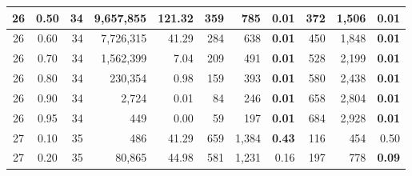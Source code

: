 \begin{table}[H]
\begin{tabular}{|c|c|r|r|r|r|r|r|r|r|r|}
        26                              & 0.50                              & 34                                     & 9,657,855                         & 121.32                            & 359           & 785              & \textbf{0.01} & 372           & 1,506            & \textbf{0.01} \\ \hline
        26                              & 0.60                              & 34                                     & 7,726,315                         & 41.29                             & 284           & 638              & \textbf{0.01} & 450           & 1,848            & \textbf{0.01} \\ \hline
        26                              & 0.70                              & 34                                     & 1,562,399                         & 7.04                              & 209           & 491              & \textbf{0.01} & 528           & 2,199            & \textbf{0.01} \\ \hline
        26                              & 0.80                              & 34                                     & 230,354                           & 0.98                              & 159           & 393              & \textbf{0.01} & 580           & 2,438            & \textbf{0.01} \\ \hline
        26                              & 0.90                              & 34                                     & 2,724                             & 0.01                              & 84            & 246              & \textbf{0.01} & 658           & 2,804            & \textbf{0.01} \\ \hline
        26                              & 0.95                              & 34                                     & 449                               & 0.00                              & 59            & 197              & \textbf{0.01} & 684           & 2,928            & \textbf{0.01} \\ \hline
        27                              & 0.10                              & 35                                     & 486                               & 41.29                             & 659           & 1,384            & \textbf{0.43} & 116           & 454              & 0.50          \\ \hline
        27                              & 0.20                              & 35                                     & 80,865                            & 44.98                             & 581           & 1,231            & 0.16          & 197           & 778              & \textbf{0.09} \\ \hline

\end{tabular}
\end{table}

